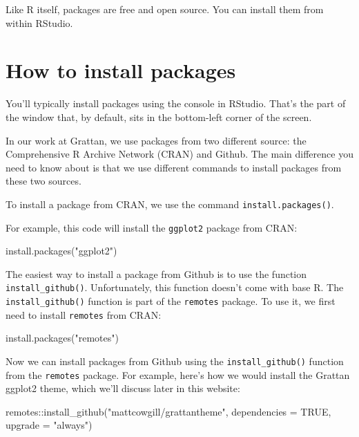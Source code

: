 \documentclass[
]{book}
\newenvironment{Shaded}{\begin{snugshade}}{\end{snugshade}}
\newcommand{\AttributeTok}[1]{\textcolor[rgb]{0.77,0.63,0.00}{#1}}
\newcommand{\ConstantTok}[1]{\textcolor[rgb]{0.00,0.00,0.00}{#1}}
\newcommand{\FunctionTok}[1]{\textcolor[rgb]{0.00,0.00,0.00}{#1}}
\newcommand{\NormalTok}[1]{#1}
\newcommand{\SpecialCharTok}[1]{\textcolor[rgb]{0.00,0.00,0.00}{#1}}
\newcommand{\StringTok}[1]{\textcolor[rgb]{0.31,0.60,0.02}{#1}}
\begin{document}
Like R itself, packages are free and open source. You can install them from within RStudio.

\hypertarget{install-packages}{%
\section{How to install packages}\label{install-packages}}

You'll typically install packages using the console in RStudio. That's the part of the window that, by default, sits in the bottom-left corner of the screen.

In our work at Grattan, we use packages from two different source: the Comprehensive R Archive Network (CRAN) and Github. The main difference you need to know about is that we use different commands to install packages from these two sources.

To install a package from CRAN, we use the command \texttt{install.packages()}.

For example, this code will install the \texttt{ggplot2} package from CRAN:

\begin{Shaded}
\begin{Highlighting}[]
\FunctionTok{install.packages}\NormalTok{(}\StringTok{"ggplot2"}\NormalTok{)}
\end{Highlighting}
\end{Shaded}

The easiest way to install a package from Github is to use the function \texttt{install\_github()}. Unfortunately, this function doesn't come with base R. The \texttt{install\_github()} function is part of the \texttt{remotes} package. To use it, we first need to install \texttt{remotes} from CRAN:

\begin{Shaded}
\begin{Highlighting}[]
\FunctionTok{install.packages}\NormalTok{(}\StringTok{"remotes"}\NormalTok{)}
\end{Highlighting}
\end{Shaded}

Now we can install packages from Github using the \texttt{install\_github()} function from the \texttt{remotes} package. For example, here's how we would install the Grattan ggplot2 theme, which we'll discuss later in this website:

\begin{Shaded}
\begin{Highlighting}[]
\NormalTok{remotes}\SpecialCharTok{::}\FunctionTok{install\_github}\NormalTok{(}\StringTok{"mattcowgill/grattantheme"}\NormalTok{, }\AttributeTok{dependencies =} \ConstantTok{TRUE}\NormalTok{, }\AttributeTok{upgrade =} \StringTok{"always"}\NormalTok{)}
\end{Highlighting}
\end{Shaded}
\end{document}
